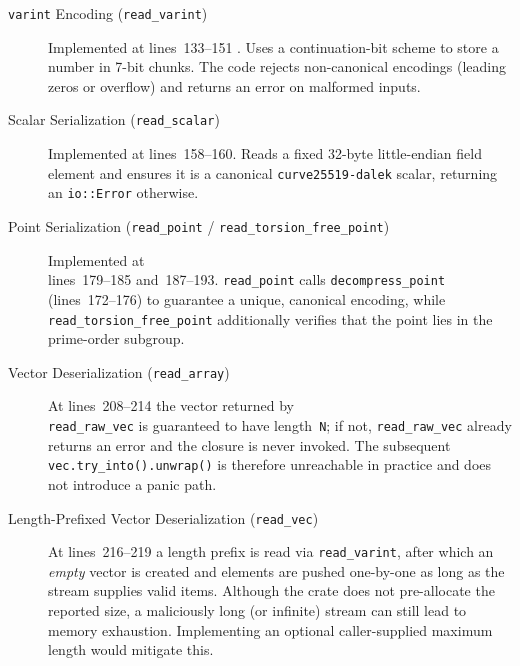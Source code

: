 \documentclass[12pt,a4paper]{article}
\begin{document}
\begin{description}
\item[\texttt{varint} Encoding (\texttt{read\_varint})]
  Implemented at lines~133--151 .
  Uses a continuation-bit scheme to store a number in 7-bit chunks.
  The code rejects non-canonical encodings (leading zeros or overflow) and
  returns an error on malformed inputs.

\item[Scalar Serialization (\texttt{read\_scalar})]
  Implemented at lines~158--160.
  Reads a fixed 32-byte little-endian field element and ensures it is a
  canonical \texttt{curve25519-dalek} scalar, returning an
  \texttt{io::Error} otherwise.

\item[Point Serialization (\texttt{read\_point} /
      \texttt{read\_torsion\_free\_point})]
  Implemented at \\lines~179--185 and~187--193.
  \texttt{read\_point} calls \texttt{decompress\_point}
  (lines~172--176) to guarantee a unique, canonical encoding, while
  \texttt{read\_torsion\_free\_point} additionally verifies that the
  point lies in the prime-order subgroup.

\item[Vector Deserialization (\texttt{read\_array})]
  \label{item:read-array-lines208-214}
  At lines~208--214 the vector returned by \\\texttt{read\_raw\_vec} is
  guaranteed to have length~\texttt{N}; if not, \texttt{read\_raw\_vec}
  already returns an error and the closure is never invoked.  The
  subsequent \\\texttt{vec.try\_into().unwrap()} is therefore
  unreachable in practice and does not introduce a panic path.

\item[Length-Prefixed Vector Deserialization (\texttt{read\_vec})]
  \label{item:read-vec-lines216-219}
  At lines~216--219 a length prefix is read via \texttt{read\_varint},
  after which an \emph{empty} vector is created and elements are pushed
  one-by-one as long as the stream supplies valid items.
  Although the crate does not pre-allocate the reported size, a
  maliciously long (or infinite) stream can still lead to memory
  exhaustion.  Implementing an optional caller-supplied maximum length
  would mitigate this.

\end{description}
\end{document}
